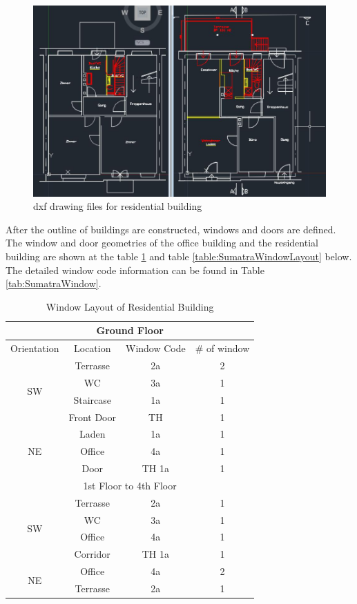 \documentclass[11pt, a4paper]{article}
\theoremstyle{definition}
\begin{document}
			\begin{figure}[H]
			\centering
			\includegraphics[scale=0.65]{Hongger_dxf.jpg}
			\caption{dxf drawing files for residential building}
			\label{fig:HonggerDxf}
			\end{figure}
			

			After the outline of buildings are constructed, windows and doors are defined. The window and door geometries of the office building and the residential building are shown at the table \ref{table:HonggerWindowLayout} and table \ref{table:SumatraWindowLayout} below. The detailed window code information can be found in Table \ref{tab:SumatraWindow}. \\

				\begin{table}[H]
				\centering
				\caption{Window Layout of Residential Building}
				\begin{tabular}{  c | c | c | c  }
					\hline
					\multicolumn{4}{c}{Ground Floor} \\ 
					\hline
					Orientation & Location & Window Code & \# of window \\ \hline
					\multirow{4}{*}{SW} & Terrasse & 2a & 2 \\ 
					 & WC & 3a & 1 \\ 
					 & Staircase & 1a & 1 \\ 
					 & Front Door & TH & 1 \\ \hline
					\multirow{3}{*}{NE} & Laden & 1a & 1 \\ 
					 & Office & 4a & 1 \\ 
					 & Door & TH 1a & 1 \\ \hline
					\multicolumn{4}{c}{1st Floor to 4th Floor}\\ \hline
					\multirow{4}{*}{SW} & Terrasse & 2a & 1 \\ 
					 & WC & 3a & 1 \\ 
					 & Office & 4a & 1 \\ 
					 & Corridor & TH 1a & 1 \\ \hline
					\multirow{2}{*}{NE} & Office & 4a & 2 \\ 
					 & Terrasse & 2a & 1 \\ 
					 \hline
				\end{tabular}
				\label{table:HonggerWindowLayout}
				\end{table}
\end{document}

